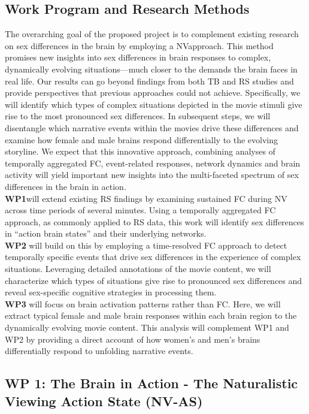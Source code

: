 \documentclass[11pt,a4paper]{article}
\begin{document}
\subsection*{Work Program and Research Methods}
The overarching goal of the proposed project is to complement existing research on sex differences in the brain by 
employing a NVapproach. This method promises new insights into sex differences in brain responses to complex, 
dynamically evolving situations—much closer to the demands the brain faces in real life. Our results can go beyond 
findings from both TB and RS studies and provide perspectives that previous approaches could not achieve. 
Specifically, we will identify which types of complex situations depicted in the movie stimuli give rise to the 
most pronounced sex differences. In subsequent steps, we will disentangle which narrative events within the 
movies drive these differences and examine how female and male brains respond differentially to the evolving storyline. 
We expect that this innovative approach, combining analyses of temporally aggregated 
FC, event-related responses, network dynamics and brain activity will yield important new insights into 
the multi-faceted spectrum of sex differences in the brain in action.\\
\textbf{WP1}will extend existing RS findings by examining sustained FC during NV across time periods of several 
minutes. Using a temporally aggregated FC approach, as commonly applied to RS data, this work will identify 
sex differences in “action brain states” and their underlying networks.\\
\textbf{WP2} will build on this by employing a time-resolved FC approach to detect temporally specific events 
that drive sex differences in the experience of complex situations. Leveraging detailed annotations of the 
movie content, we will characterize which types of situations give rise to pronounced sex differences and 
reveal sex-specific cognitive strategies in processing them.\\
\textbf{WP3} will focus on brain activation patterns rather than FC. Here, we will extract typical female 
and male brain responses within each brain region to the dynamically evolving movie content. This analysis will 
complement WP1 and WP2 by providing a direct account of how women's and men's brains differentially respond 
to unfolding narrative events.

\subsection*{WP 1: The Brain in Action - The Naturalistic Viewing Action State (NV-AS)}
\end{document}
